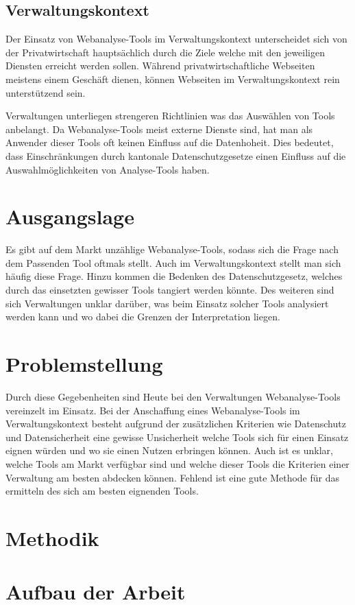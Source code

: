 \subsection{Verwaltungskontext}

Der Einsatz von Webanalyse-Tools im Verwaltungskontext unterscheidet sich von der Privatwirtschaft hauptsächlich durch die Ziele welche mit den jeweiligen Diensten erreicht werden sollen. Während privatwirtschaftliche Webseiten meistens einem Geschäft dienen, können Webseiten im Verwaltungskontext rein unterstützend sein.

Verwaltungen unterliegen strengeren Richtlinien was das Auswählen von Tools anbelangt. Da Webanalyse-Tools meist externe Dienste sind, hat man als Anwender dieser Tools oft keinen Einfluss auf die Datenhoheit. Dies bedeutet, dass Einschränkungen durch kantonale Datenschutzgesetze einen Einfluss auf die Auswahlmöglichkeiten von Analyse-Tools haben.


\section{Ausgangslage}
Es gibt auf dem Markt unzählige Webanalyse-Tools, sodass sich die Frage nach dem Passenden Tool oftmals stellt. Auch im Verwaltungskontext stellt man sich häufig diese Frage. Hinzu kommen die Bedenken des Datenschutzgesetz, welches durch das einsetzten gewisser Tools tangiert werden könnte. Des weiteren sind sich Verwaltungen unklar darüber, was beim Einsatz solcher Tools analysiert werden kann und wo dabei die Grenzen der Interpretation liegen.

\section{Problemstellung}

Durch diese Gegebenheiten sind Heute bei den Verwaltungen Webanalyse-Tools vereinzelt im Einsatz. Bei der Anschaffung eines Webanalyse-Tools im Verwaltungskontext besteht aufgrund der zusätzlichen Kriterien wie Datenschutz und Datensicherheit eine gewisse Unsicherheit welche Tools sich für einen Einsatz eignen würden und wo sie einen Nutzen erbringen können. Auch ist es unklar, welche Tools am Markt verfügbar sind und welche dieser Tools die Kriterien einer Verwaltung am besten abdecken können. Fehlend ist eine gute Methode für das ermitteln des sich am besten eignenden Tools.

\section{Methodik}


\section{Aufbau der Arbeit}

